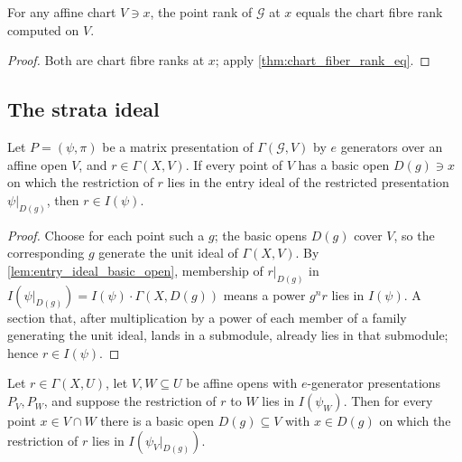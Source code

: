 \begin{lemma}
  \label{lem:point_rank_eq_chart_fiber_rank}
  \leanok
  For any affine chart \(V \ni x\), the point rank of \(\mathcal G\) at \(x\)
  equals the chart fibre rank computed on \(V\).
\end{lemma}

\begin{proof}
  \leanok
  Both are chart fibre ranks at \(x\); apply \cref{thm:chart_fiber_rank_eq}.
\end{proof}

\subsection{The strata ideal}

\begin{lemma}
  \label{lem:mem_entry_ideal_locally}
  \leanok
  Let \(P = (\psi, \pi)\) be a matrix presentation of
  \(\Gamma(\mathcal G, V)\) by \(e\) generators over an affine open \(V\), and
  \(r \in \Gamma(X, V)\).  If every point of \(V\) has a basic open
  \(D(g) \ni x\) on which the restriction of \(r\) lies in the entry ideal of
  the restricted presentation \(\psi|_{D(g)}\), then \(r \in I(\psi)\).
\end{lemma}

\begin{proof}
  \leanok
  Choose for each point such a \(g\); the basic opens \(D(g)\) cover \(V\), so
  the corresponding \(g\) generate the unit ideal of \(\Gamma(X, V)\).  By
  \cref{lem:entry_ideal_basic_open}, membership of \(r|_{D(g)}\) in
  \(I(\psi|_{D(g)}) = I(\psi) \cdot \Gamma(X, D(g))\) means a power
  \(g^{n} r\) lies in \(I(\psi)\).  A section that, after multiplication by a
  power of each member of a family generating the unit ideal, lands in a
  submodule, already lies in that submodule; hence \(r \in I(\psi)\).
\end{proof}

\begin{lemma}
  \label{lem:entry_ideal_chart_transfer}
  \leanok
  Let \(r \in \Gamma(X, U)\), let \(V, W \subseteq U\) be affine opens with
  \(e\)-generator presentations \(P_V, P_W\), and suppose the restriction of
  \(r\) to \(W\) lies in \(I(\psi_W)\).  Then for every point
  \(x \in V \cap W\) there is a basic open \(D(g) \subseteq V\) with
  \(x \in D(g)\) on which the restriction of \(r\) lies in
  \(I(\psi_V|_{D(g)})\).
\end{lemma}

